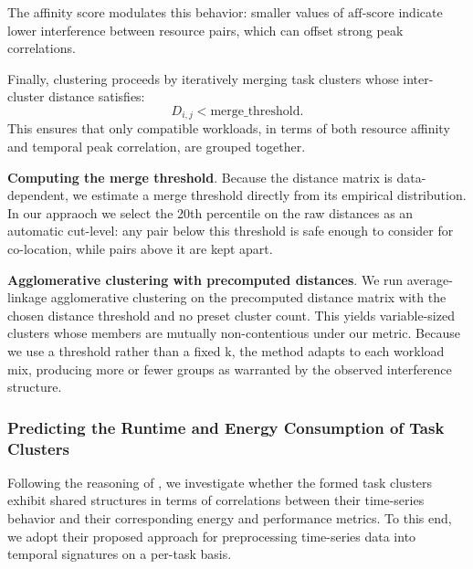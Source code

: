 The affinity score modulates this behavior:
smaller values of \( \mathrm{aff\text{-}score} \)
indicate lower interference between resource pairs,
which can offset strong peak correlations.

Finally, clustering proceeds by iteratively merging task clusters
whose inter-cluster distance satisfies:
\[
    D_{i,j} < \text{merge\_threshold}.
\]
This ensures that only compatible workloads, in terms of both
resource affinity and temporal peak correlation, are grouped together.

\textbf{Computing the merge threshold}. Because the distance matrix is data-dependent, we estimate a merge threshold directly from its empirical distribution. In our appraoch we select the 20th percentile on the raw distances as an automatic cut-level: any pair below this threshold is safe enough to consider for co-location, while pairs above it are kept apart.

\textbf{Agglomerative clustering with precomputed distances}. We run average-linkage agglomerative clustering on the precomputed distance matrix with the chosen distance threshold and no preset cluster count. This yields variable-sized clusters whose members are mutually non-contentious under our metric. Because we use a threshold rather than a fixed k, the method adapts to each workload mix, producing more or fewer groups as warranted by the observed interference structure.



\subsubsection{Predicting the Runtime and Energy Consumption of Task Clusters}
\label{sec:prediciton_kcca_rfr}

Following the reasoning of \cite{5644899}, we investigate whether the formed task clusters exhibit shared structures in terms of correlations between their time-series behavior and their corresponding energy and performance metrics. To this end, we adopt their proposed approach for preprocessing time-series data into temporal signatures on a per-task basis.

